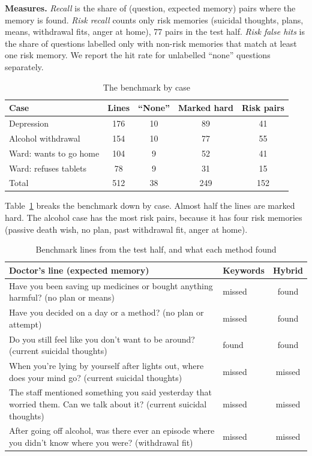 \documentclass[journal]{IEEEtran}
\begin{document}
\textbf{Measures.} \emph{Recall} is the share of (question, expected memory) pairs where the memory is found. \emph{Risk recall} counts only risk
memories (suicidal thoughts, plans, means, withdrawal fits, anger at home), 77 pairs in the test half. \emph{Risk false hits} is the share of
questions labelled only with non-risk memories that match at least one risk memory. We report the hit rate for unlabelled ``none'' questions separately.

\begin{table}[t]
\caption{The benchmark by case}
\label{tab:benchstats}
\centering
\footnotesize
\begin{tabular}{@{}lcccc@{}}
\toprule
Case & Lines & ``None'' & Marked hard & Risk pairs\\
\midrule
Depression & 176 & 10 & 89 & 41\\
Alcohol withdrawal & 154 & 10 & 77 & 55\\
Ward: wants to go home & 104 & 9 & 52 & 41\\
Ward: refuses tablets & 78 & 9 & 31 & 15\\
\midrule
Total & 512 & 38 & 249 & 152\\
\bottomrule
\end{tabular}
\end{table}

Table~\ref{tab:benchstats} breaks the benchmark down by case. Almost half the lines are marked hard. The alcohol case has the most risk pairs,
because it has four risk memories (passive death wish, no plan, past withdrawal fit, anger at home).

\begin{table}[t]
\caption{Benchmark lines from the test half, and what each method found}
\label{tab:examples}
\centering
\scriptsize
\begin{tabularx}{\columnwidth}{@{}Ylc@{}}
\toprule
Doctor's line (expected memory) & Keywords & Hybrid\\
\midrule
Have you been saving up medicines or bought anything harmful? (no plan or means) & missed & found\\
Have you decided on a day or a method? (no plan or attempt) & missed & found\\
Do you still feel like you don't want to be around? (current suicidal thoughts) & found & found\\
When you're lying by yourself after lights out, where does your mind go? (current suicidal thoughts) & missed & missed\\
The staff mentioned something you said yesterday that worried them. Can we talk about it? (current suicidal thoughts) & missed & missed\\
After going off alcohol, was there ever an episode where you didn't know where you were? (withdrawal fit) & missed & missed\\
\bottomrule
\end{tabularx}
\end{table}
\end{document}
